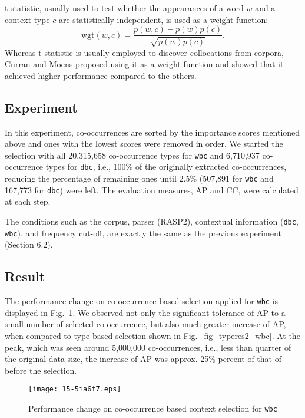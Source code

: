 \documentclass[english]{jnlp_1.4}
\begin{document}
t-statistic, usually used to test whether the appearances of a word $w$ and
a context type $c$ are statistically independent, is used as a weight function:
\[
  \mbox{wgt}(w,c) = \frac{p(w, c) - p(w)p(c)}{\sqrt{p(w)p(c)}}.
\]
\pagebreak
Whereas t-statistic is usually employed to discover collocations from
corpora, Curran and Moens \cite{Curran:02:improvements} proposed using
it as a weight function and showed that it achieved higher performance
compared to the others.


\subsection{Experiment}

In this experiment, co-occurrences are sorted by the importance scores
mentioned above and ones with the lowest scores were removed in
order. We started the selection with all 20,315,658 co-occurrence
types for {\tt wbc} and 6,710,937 co-occurrence types for {\tt dbc},
i.e., 100\% of the originally extracted co-occurrences, reducing the
percentage of remaining ones until 2.5\% (507,891 for {\tt wbc} and
167,773 for {\tt dbc}) were left.  The evaluation measures, AP and CC,
were calculated at each step.

The conditions such as the corpus, parser (RASP2), contextual
information ({\tt dbc}, {\tt wbc}), and frequency cut-off, are exactly
the same as the previous experiment (Section 6.2).

\subsection{Result}

The performance change on co-occurrence based selection applied for
{\tt wbc} is displayed in Fig.~\ref{fig_cocrres_wbc}. We observed not
only the significant tolerance of AP to a small number of selected
co-occurrence, but also much greater increase of AP, when compared to
type-based selection shown in Fig.~\ref{fig_typeres2_wbc}. At the
peak, which was seen around 5,000,000 co-occurrences, i.e., less than
quarter of the original data size, the increase of AP was approx. 25\%
percent of that of before the selection.

\begin{figure}[b]
\begin{center}
\texttt{[image: 15-5ia6f7.eps]}
\end{center}
\caption{Performance change on co-occurrence based context selection for {\tt wbc}}
\label{fig_cocrres_wbc}
\end{figure}
\end{document}
